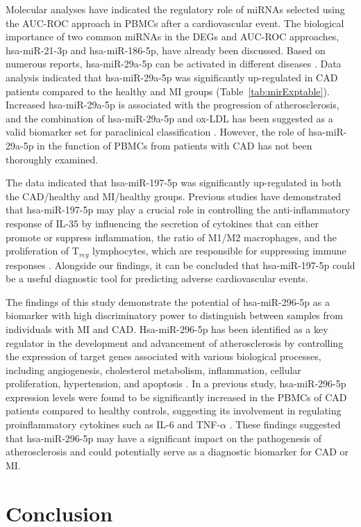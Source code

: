 \documentclass[sn-mathphys,Numbered]{sn-jnl}%
\theoremstyle{thmstyleone}%
\theoremstyle{thmstyletwo}%
\theoremstyle{thmstylethree}%
\begin{document}
Molecular analyses have indicated the regulatory role of miRNAs selected
using the AUC-ROC approach in PBMCs after a cardiovascular event. The
biological importance of two common miRNAs in the DEGs and AUC-ROC
approaches, hsa-miR-21-3p and hsa-miR-186-5p, have already been discussed. Based on
numerous reports, hsa-miR-29a-5p can be activated in different diseases \cite{29aa}. Data analysis indicated that
hsa-miR-29a-5p was significantly up-regulated in CAD patients compared to the
healthy and MI groups (Table~\ref{tab:mirExptable}). Increased hsa-miR-29a-5p
is associated with the progression of atherosclerosis, and the
combination of hsa-miR-29a-5p and ox-LDL has been suggested as a valid
biomarker set for paraclinical classification \cite{29a}.
However, the role of hsa-miR-29a-5p in the function of PBMCs from patients with
CAD has not been thoroughly examined.

The data indicated that hsa-miR-197-5p was significantly up-regulated in both
the CAD/healthy and MI/healthy groups. Previous studies have
demonstrated that hsa-miR-197-5p may play a crucial role in controlling the
anti-inflammatory response of IL-35 by influencing the secretion of
cytokines that can either promote or suppress inflammation, the ratio of
M1/M2 macrophages, and the proliferation of T$_{reg}$ lymphocytes,
which are responsible for suppressing immune responses \cite{197}. Alongside our findings, it can be concluded that hsa-miR-197-5p could be
a useful diagnostic tool for predicting adverse cardiovascular events.

The findings of this study demonstrate the potential of hsa-miR-296-5p as a
biomarker with high discriminatory power to distinguish between samples
from individuals with MI and CAD. Hsa-miR-296-5p has been identified as a key
regulator in the development and advancement of atherosclerosis by
controlling the expression of target genes associated with various
biological processes, including angiogenesis, cholesterol metabolism,
inflammation, cellular proliferation, hypertension, and apoptosis \cite{296}. In a previous study, hsa-miR-296-5p expression levels were found
to be significantly increased in the PBMCs of CAD patients compared to
healthy controls, suggesting its involvement in regulating
proinflammatory cytokines such as IL-6 and TNF-$\alpha$ \cite{296a}. These findings suggested that hsa-miR-296-5p may have a significant
impact on the pathogenesis of atherosclerosis and could potentially
serve as a diagnostic biomarker for CAD or MI.
 

\section{Conclusion}\label{conclusion}
\end{document}
